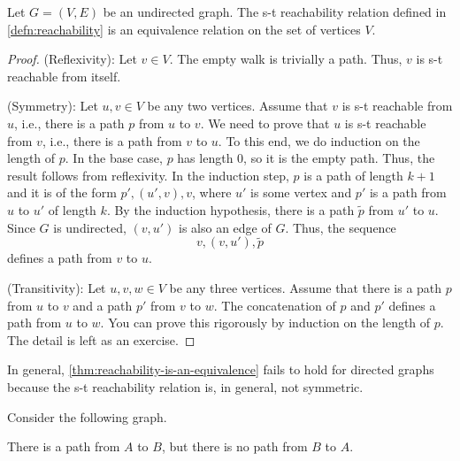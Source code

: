 \documentclass{amsart}
\begin{document}
\begin{thm}
  \label{thm:reachability-is-an-equivalence}
  Let $G = (V, E)$ be an undirected graph.
  The s-t reachability relation defined in \cref{defn:reachability} is an equivalence relation on the set of vertices $V$.
\end{thm}
\begin{proof}
  (Reflexivity): Let $v \in V$.
  The empty walk is trivially a path.
  Thus, $v$ is s-t reachable from itself.
  
  (Symmetry): Let $u,v \in V$ be any two vertices.
  Assume that $v$ is s-t reachable from $u$, i.e., there is a path $p$ from $u$ to $v$.
  We need to prove that $u$ is s-t reachable from $v$, i.e., there is a path from $v$ to $u$.
  To this end, we do induction on the length of $p$.
  In the base case, $p$ has length 0, so it is the empty path.
  Thus, the result follows from reflexivity.
  In the induction step, $p$ is a path of length $k+1$ and it is of the form $p',(u',v),v$, where $u'$ is some vertex and $p'$ is a path from $u$ to $u'$ of length $k$.
  By the induction hypothesis, there is a path $\widetilde{p}$ from $u'$ to $u$.
  Since $G$ is undirected, $(v,u')$ is also an edge of $G$.
  Thus, the sequence
  \[
    v,(v,u'),\widetilde{p}
  \]
  defines a path from $v$ to $u$.

  (Transitivity): Let $u,v,w \in V$ be any three vertices.
  Assume that there is a path $p$ from $u$ to $v$ and a path $p'$ from $v$ to $w$.
  The concatenation of $p$ and $p'$ defines a path from $u$ to $w$.
  You can prove this rigorously by induction on the length of $p$.
  The detail is left as an exercise.
\end{proof}

\begin{rmk}
  \label{rmk:reachability-not-equivalence-for-directed-graphs}
  In general, \cref{thm:reachability-is-an-equivalence} fails to hold for directed graphs because the s-t reachability relation is, in general, not symmetric.
\end{rmk}

\begin{ceg}
  \label{ceg:reachability-not-equivalence-for-directed-graphs-nonexample-1}
  Consider the following graph.
  \begin{center}
  \end{center}
  There is a path from $A$ to $B$, but there is no path from $B$ to $A$.
\end{ceg}
\end{document}
